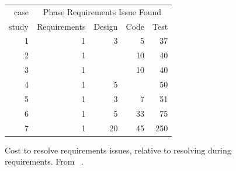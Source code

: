 \documentclass[smallcondensed]{svjour3}
\begin{document}
 


 \begin{figure}
{\small
\begin{center}
\begin{tabular}{r|rrrr}
 case& \multicolumn{4}{c}{Phase Requirements Issue Found }  \\
 study               &Requirements & Design & Code&  Test\\\hline
1& 1 &3& 5& 37\\  
2& 1  &    & 10 & 40 \\ 
3& 1   &    & 10 &  40 \\
4&  1  &   5 &      & 50  \\
5&  1 &3& 7& 51 \\
6& 1& 5 &33 &75  \\
7&  1 & 20 & 45 & 250 \\  
\end{tabular}
\end{center}}
\caption{Cost to resolve requirements issues, relative to resolving  during requirements. From ~\cite{steck04}.}\label{fig:steck}
\end{figure}



 
 
 
\end{document}
